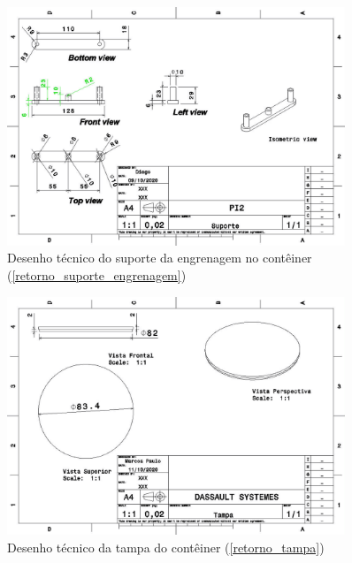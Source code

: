 \begin{apendicesenv}
\begin{figure}[H]
    \centering
    \includegraphics[width=0.9\textwidth]{figuras/estrutura/Desenhos/Suporte_Engrenagem_Container.jpg}
    \caption{Desenho técnico do suporte da engrenagem no contêiner (\ref{retorno_suporte_engrenagem})}
    \label{fig:supp_engrenagem}
\end{figure}

\begin{figure}[H]
    \centering
    \includegraphics[width=0.9\textwidth]{figuras/estrutura/Desenhos/Tampa_Container.jpg}
    \caption{Desenho técnico da tampa do contêiner (\ref{retorno_tampa})}
    \label{fig:tampa}
\end{figure}


\end{apendicesenv}

